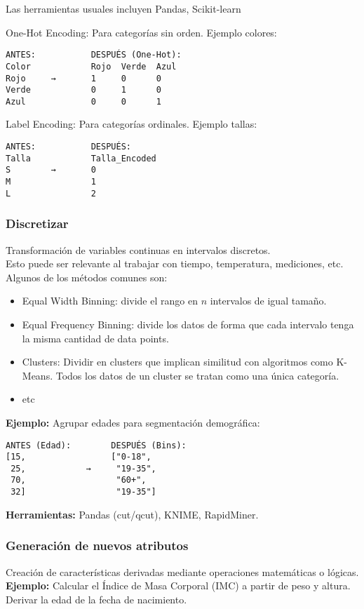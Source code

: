 \documentclass[12pt]{book}
\begin{document}
Las herramientas usuales incluyen Pandas, Scikit-learn

One-Hot Encoding: Para categorías sin orden. Ejemplo colores:
\begin{verbatim}
ANTES:           DESPUÉS (One-Hot):
Color            Rojo  Verde  Azul
Rojo     →       1     0      0
Verde            0     1      0
Azul             0     0      1
\end{verbatim}
Label Encoding: Para categorías ordinales. Ejemplo tallas:
\begin{verbatim}
ANTES:           DESPUÉS:
Talla            Talla_Encoded
S        →       0
M                1
L                2
\end{verbatim}

\subsubsection{Discretizar}
Transformación de variables continuas en intervalos discretos.\\
Esto puede ser relevante al trabajar con tiempo, temperatura, mediciones, etc.
Algunos de los métodos comunes son:
\begin{itemize}
    \item Equal Width Binning: divide el rango en $n$ intervalos de igual tamaño.
    \item Equal Frequency Binning: divide los datos de forma que cada intervalo tenga la misma cantidad de data points.
    \item Clusters: Dividir en clusters que implican similitud con algoritmos como K-Means. Todos los datos de un cluster se tratan como una única categoría.
    \item etc
\end{itemize}

\textbf{Ejemplo:} 
Agrupar edades para segmentación demográfica:
\begin{verbatim}
ANTES (Edad):        DESPUÉS (Bins):
[15,                 ["0-18",
 25,            →     "19-35",
 70,                  "60+",
 32]                  "19-35"]
\end{verbatim}

\textbf{Herramientas:} Pandas (cut/qcut), KNIME, RapidMiner.

\subsubsection{Generación de nuevos atributos}
Creación de características derivadas mediante operaciones matemáticas o lógicas. \\
\textbf{Ejemplo:} Calcular el Índice de Masa Corporal (IMC) a partir de peso y altura.
Derivar la edad de la fecha de nacimiento.\\
\end{document}
